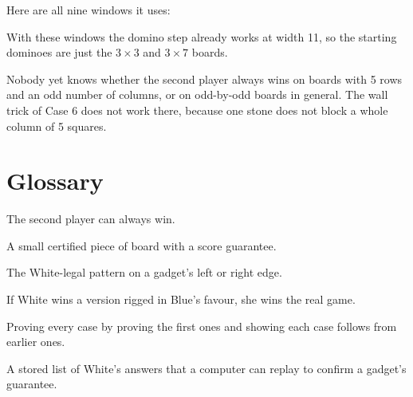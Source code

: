 \documentclass[11pt]{article}
\begin{document}
Here are all nine windows it uses:

\begin{center}
\end{center}

With these windows the domino step already works at width 11, so the
starting dominoes are just the $3\times3$ and $3\times7$ boards.

\begin{careful}
Nobody yet knows whether the second player always wins on boards with 5 rows
and an odd number of columns, or on odd-by-odd boards in general. The wall
trick of Case 6 does not work there, because one stone does not block a whole
column of 5 squares.
\end{careful}

\section*{Glossary}
\begin{description}[nosep, font=\normalfont\bfseries]
\item[Value zero] The second player can always win.
\item[Gadget] A small certified piece of board with a score guarantee.
\item[Plug / port] The White-legal pattern on a gadget's left or right edge.
\item[Comparison principle] If White wins a version rigged in Blue's favour,
she wins the real game.
\item[Induction] Proving every case by proving the first ones and showing each
case follows from earlier ones.
\item[Certificate] A stored list of White's answers that a computer can replay
to confirm a gadget's guarantee.
\end{description}
\end{document}
